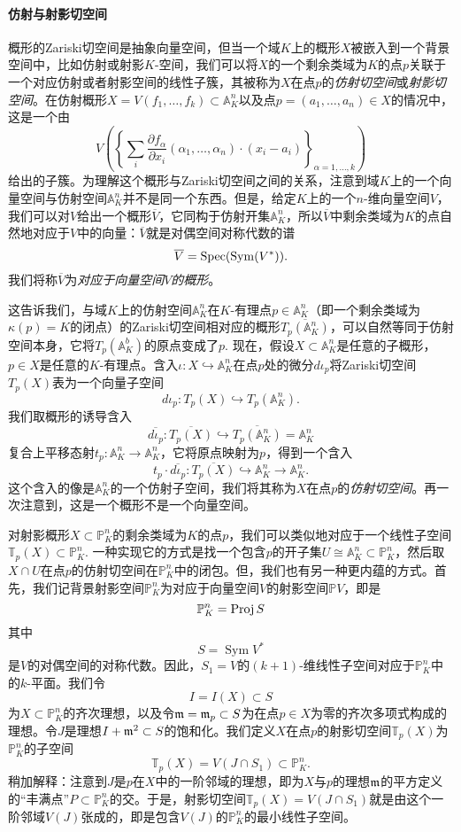 \paragraph*{仿射与射影切空间}
概形的Zariski切空间是抽象向量空间，但当一个域$K$上的概形$X$被嵌入到一个背景空间中，比如仿射或射影$K$-空间，我们可以将$X$的一个剩余类域为$K$的点$p$关联于一个对应仿射或者射影空间的线性子簇，其被称为$X$在点$p$的\textit{仿射切空间}或\textit{射影切空间}。在仿射概形$X=V(f_1,\dots,f_k)\subset \mathbb A_K^n$以及点$p=(a_1,\dots,a_n)\in X$的情况中，这是一个由
\[
	V\left(\left\{
		\sum_i \frac{\partial f_\alpha}{\partial x_i}(\alpha_1,\dots,\alpha_n)\cdot (x_i-a_i)
	\right\}_{\alpha=1,\dots,k}
	\right)
\]
给出的子簇。为理解这个概形与Zariski切空间之间的关系，注意到域$K$上的一个向量空间与仿射空间$\mathbb A_K^n$并不是同一个东西。但是，给定$K$上的一个$n$-维向量空间$V$，我们可以对$V$给出一个概形$\overline{V}$，它同构于仿射开集$\mathbb A_K^n$，所以$\overline{V}$中剩余类域为$K$的点自然地对应于$V$中的向量：$\overline{V}$就是对偶空间对称代数的谱
\[
	\overline{V}=\operatorname{Spec} (\operatorname{Sym}(V^*)).
\]
我们将称$\overline{V}$为\textit{对应于向量空间$V$的概形}。

这告诉我们，与域$K$上的仿射空间$\mathbb A_K^n$在$K$-有理点$p\in \mathbb A^n_K$（即一个剩余类域为$\kappa(p)=K$的闭点）的Zariski切空间相对应的概形$\overline{T_p(\mathbb A^n_K)}$，可以自然等同于仿射空间本身，它将$T_p(\mathbb A_K^b)$的原点变成了$p$. 现在，假设$X\subset \mathbb A_K^n$是任意的子概形，$p\in X$是任意的$K$-有理点。含入$\iota:X\hookrightarrow \mathbb A_K^n$在点$p$处的微分$d\iota_p$将Zariski切空间$T_p(X)$表为一个向量子空间
\[
	d\iota_p:T_p(X)\hookrightarrow T_p(\mathbb A_K^n).
\]
我们取概形的诱导含入
\[
	\overline{d\iota_p}:\overline{T_p(X)}\hookrightarrow
	\overline{T_p(\mathbb A_K^n)}=\mathbb A_K^n
\]
复合上平移态射$t_p:\mathbb A^n_K\to \mathbb A^n_K$，它将原点映射为$p$，得到一个含入
\[
	t_p\cdot \overline{d\iota_p}:\overline{T_p(X)}\hookrightarrow
	\mathbb A_K^n \longrightarrow \mathbb A_K^n.
\]
这个含入的像是$\mathbb A_K^n$的一个仿射子空间，我们将其称为$X$在点$p$的\textit{仿射切空间}。再一次注意到，这是一个概形不是一个向量空间。

对射影概形$X\subset \mathbb P_K^n$的剩余类域为$K$的点$p$，我们可以类似地对应于一个线性子空间$\mathbb T_p(X)\subset \mathbb P_K^n$. 一种实现它的方式是找一个包含$p$的开子集$U\cong \mathbb A_K^n\subset \mathbb P^n_K$，然后取$X\cap U$在点$p$的仿射切空间在$\mathbb P_K^n$中的闭包。但，我们也有另一种更内蕴的方式。首先，我们记背景射影空间$\mathbb P_K^n$为对应于向量空间$V$的射影空间$\mathbb PV$，即是
\[
	\mathbb P_K^n=\operatorname{Proj} S
\]
其中
\[
	S=\operatorname{Sym}V^*
\]
是$V$的对偶空间的对称代数。因此，$S_1=V$的$(k+1)$-维线性子空间对应于$\mathbb P_K^n$中的$k$-平面。我们令
\[
	I=I(X)\subset S
\]
为$X\subset \mathbb P_K^n$的齐次理想，以及令$\mathfrak{m}=\mathfrak{m}_p\subset S$为在点$p\in X$为零的齐次多项式构成的理想。令$J$是理想$I+\mathfrak{m}^2\subset S$的饱和化。我们定义$X$在点$p$的射影切空间$\mathbb T_p(X)$为$\mathbb P_K^n$的子空间
\[
	\mathbb T_p (X)=V(J\cap S_1)\subset \mathbb P^n_K.
\]
稍加解释：注意到$J$是$p$在$X$中的一阶邻域的理想，即为$X$与$p$的理想$\mathfrak{m}$的平方定义的“丰满点”$P\subset \mathbb P_K^n$的交。于是，射影切空间$\mathbb T_p(X)=V(J\cap S_1)$就是由这个一阶邻域$V(J)$张成的，即是包含$V(J)$的$\mathbb P_K^n$的最小线性子空间。

